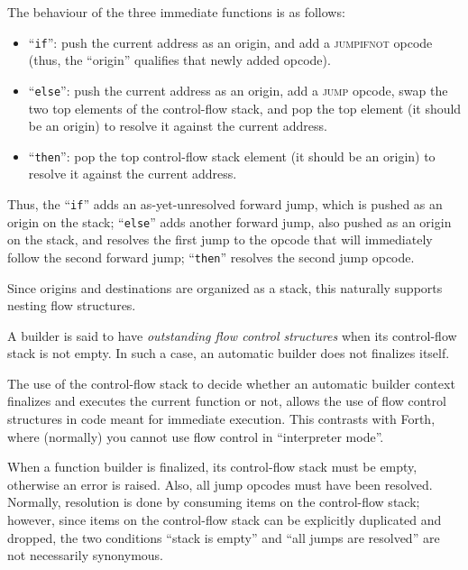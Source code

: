 The behaviour of the three immediate functions is as follows:
\begin{itemize}

    \item ``\verb|if|'': push the current address as an origin, and
    add a \textsc{jumpifnot} opcode (thus, the ``origin'' qualifies
    that newly added opcode).

    \item ``\verb|else|'': push the current address as an origin,
    add a \textsc{jump} opcode, swap the two top elements of the
    control-flow stack, and pop the top element (it should be an
    origin) to resolve it against the current address.

    \item ``\verb|then|'': pop the top control-flow stack element
    (it should be an origin) to resolve it against the current address.

\end{itemize}
Thus, the ``\verb|if|'' adds an as-yet-unresolved forward jump, which
is pushed as an origin on the stack; ``\verb|else|'' adds another
forward jump, also pushed as an origin on the stack, and resolves the
first jump to the opcode that will immediately follow the second
forward jump; ``\verb|then|'' resolves the second jump opcode.

Since origins and destinations are organized as a stack, this naturally
supports nesting flow structures.

A builder is said to have \emph{outstanding flow control structures}
when its control-flow stack is not empty. In such a case, an automatic
builder does not finalizes itself.

\begin{rationale}
The use of the control-flow stack to decide whether an automatic builder
context finalizes and executes the current function or not, allows the
use of flow control structures in code meant for immediate execution.
This contrasts with Forth, where (normally) you cannot use flow control
in ``interpreter mode''.
\end{rationale}

When a function builder is finalized, its control-flow stack must be
empty, otherwise an error is raised. Also, all jump opcodes must have
been resolved. Normally, resolution is done by consuming items on the
control-flow stack; however, since items on the control-flow stack can
be explicitly duplicated and dropped, the two conditions ``stack is
empty'' and ``all jumps are resolved'' are not necessarily synonymous.

